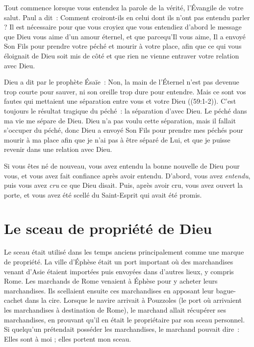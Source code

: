 Tout commence lorsque vous entendez \og la parole de la vérité,
 l'Évangile de votre salut. \fg{} Paul a dit~:
 \og Comment croiront-ils en celui dont ils n'ont pas entendu parler ? \fg{}
 Il est nécessaire pour que vous croyiez que vous entendiez d'abord le message
 que Dieu vous aime d'un amour éternel, et que parcequ'Il vous aime,
 Il a envoyé Son Fils pour prendre votre péché et mourir à votre place,
 afin que ce qui vous éloignait de Dieu soit mis de côté et que rien
 ne vienne entraver votre relation avec Dieu.

Dieu a dit par le prophète Ésaïe~:
 \og Non, la main de l'Éternel n'est pas devenue trop courte pour sauver,
 ni son oreille trop dure pour entendre. Mais ce sont vos fautes qui mettaient
 une séparation entre vous et votre Dieu \fg{} ((59:1-2)).
 C'est toujours le résultat tragique du péché~: la séparation d'avec Dieu.
 Le péché dans ma vie me sépare de Dieu.
 Dieu n'a pas voulu cette séparation, mais il fallait s'occuper du péché,
 donc Dieu a envoyé Son Fils pour prendre mes péchés
 \ocadr pour mourir à ma place \ocadr afin que je n'ai pas
 à être séparé de Lui, et que je puisse revenir
 dans une relation avec Dieu.
 \nowidow

Si vous êtes né de nouveau, vous avez entendu
 la bonne nouvelle de Dieu pour vous, et vous avez fait confiance
 après avoir entendu. D'abord, vous avez \emph{entendu},
 puis vous avez \emph{cru} ce que Dieu disait.
 Puis, après avoir cru, vous avez ouvert la porte,
 et vous avez été \og scellé du Saint-Esprit qui avait été promis. \fg{}


\section{Le sceau de propri\'et\'e de Dieu}

\begin{specialpar}{}
Le sceau était utilisé dans les temps anciens principalement
 comme une marque de propriété.
 La ville d'Éphèse était un port important où des marchandises
 venant d'Asie étaient importées puis envoyées dans d'autres lieux,
 y compris Rome.
 Les marchands de Rome venaient à Éphèse pour y acheter leurs marchandises.
 Ils scellaient ensuite ces marchandises en apposant leur bague-cachet
 dans la cire.
 Lorsque le navire arrivait à Pouzzoles
 (le port où arrivaient les marchandises à destination de Rome),
 le marchand allait récupérer ses marchandises,
 en prouvant qu'il en était le propriétaire par son sceau personnel.
 Si quelqu'un prétendait posséder les marchandises,
 le marchand pouvait dire~:
 \og Elles sont à moi ; elles portent mon sceau. \fg{}
\end{specialpar}


